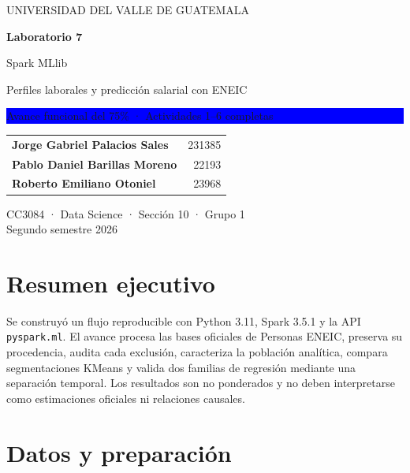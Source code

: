 \documentclass[11pt,letterpaper]{article}
\begin{document}
\begin{titlepage}
\pagecolor{Navy}
\color{white}
\vspace*{1.2cm}
{\small UNIVERSIDAD DEL VALLE DE GUATEMALA}\par
\vspace{2.2cm}
{\Huge\bfseries Laboratorio 7}\par
\vspace{0.25cm}
{\fontsize{30}{34}\selectfont Spark MLlib}\par
\vspace{0.7cm}
{\Large Perfiles laborales y predicción salarial con ENEIC}\par
\vspace{1.5cm}
\colorbox{Blue}{\parbox{0.88\textwidth}{\color{white}\centering\large Avance funcional del 75\% · Actividades 1--6 completas}}
\vfill
\begin{tabularx}{\textwidth}{X r}
\textbf{Jorge Gabriel Palacios Sales} & 231385\\[6pt]
\textbf{Pablo Daniel Barillas Moreno} & 22193\\[6pt]
\textbf{Roberto Emiliano Otoniel} & 23968\\
\end{tabularx}
\vspace{1cm}
CC3084 · Data Science · Sección 10 · Grupo 1\\
Segundo semestre 2026
\vspace*{0.7cm}
\end{titlepage}
\nopagecolor
\color{Navy}

\section{Resumen ejecutivo}

Se construyó un flujo reproducible con Python 3.11, Spark 3.5.1 y la API \texttt{pyspark.ml}. El avance procesa las bases oficiales de Personas ENEIC, preserva su procedencia, audita cada exclusión, caracteriza la población analítica, compara segmentaciones KMeans y valida dos familias de regresión mediante una separación temporal. Los resultados son no ponderados y no deben interpretarse como estimaciones oficiales ni relaciones causales.



\section{Datos y preparación}
\end{document}
